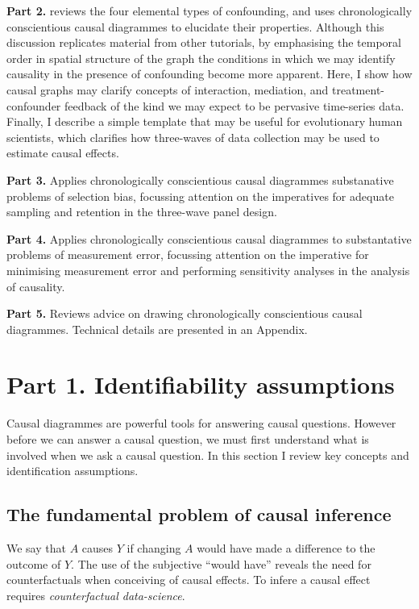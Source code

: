 \documentclass[
  singlecolumn]{report}
\begin{document}
\textbf{Part 2.} reviews the four elemental types of confounding, and
uses chronologically conscientious causal diagrammes to elucidate their
properties. Although this discussion replicates material from other
tutorials, by emphasising the temporal order in spatial structure of the
graph the conditions in which we may identify causality in the presence
of confounding become more apparent. Here, I show how causal graphs may
clarify concepts of interaction, mediation, and treatment-confounder
feedback of the kind we may expect to be pervasive time-series data.
Finally, I describe a simple template that may be useful for
evolutionary human scientists, which clarifies how three-waves of data
collection may be used to estimate causal effects.

\textbf{Part 3.} Applies chronologically conscientious causal diagrammes
substanative problems of selection bias, focussing attention on the
imperatives for adequate sampling and retention in the three-wave panel
design.

\textbf{Part 4.} Applies chronologically conscientious causal diagrammes
to substantative problems of measurement error, focussing attention on
the imperative for minimising measurement error and performing
sensitivity analyses in the analysis of causality.

\textbf{Part 5.} Reviews advice on drawing chronologically conscientious
causal diagrammes. Technical details are presented in an Appendix.

\hypertarget{part-1.-identifiability-assumptions}{%
\section{Part 1. Identifiability
assumptions}\label{part-1.-identifiability-assumptions}}

Causal diagrammes are powerful tools for answering causal questions.
However before we can answer a causal question, we must first understand
what is involved when we ask a causal question. In this section I review
key concepts and identification assumptions.

\hypertarget{the-fundamental-problem-of-causal-inference}{%
\subsection{The fundamental problem of causal
inference}\label{the-fundamental-problem-of-causal-inference}}

We say that \(A\) causes \(Y\) if changing \(A\) would have made a
difference to the outcome of \(Y\). The use of the subjective ``would
have'' reveals the need for counterfactuals when conceiving of causal
effects. To infere a causal effect requires \emph{counterfactual
data-science}.
\end{document}
